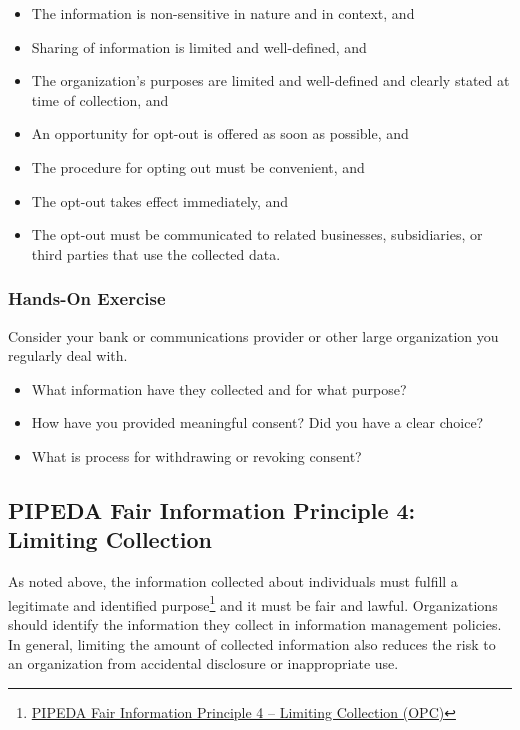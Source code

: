 \begin{itemize}
   \item The information is non-sensitive in nature and in context, and
   \item Sharing of information is limited and well-defined, and
   \item The organization's purposes are limited and well-defined and clearly stated at time of collection, and
   \item An opportunity for opt-out is offered as soon as possible, and
   \item The procedure for opting out must be convenient, and
   \item The opt-out takes effect immediately, and
   \item The opt-out must be communicated to related businesses, subsidiaries, or third parties that use the collected data.
\end{itemize}

\begin{tcolorbox}[colback=code]
\subsubsection*{Hands-On Exercise}
Consider your bank or communications provider or other large organization you regularly deal with. 
\begin{itemize}
  \item What information have they collected and for what purpose?
  \item How have you provided meaningful consent? Did you have a clear choice?
  \item What is process for withdrawing or revoking consent?
\end{itemize}
\end{tcolorbox}

\subsection*{PIPEDA Fair Information Principle 4: Limiting Collection}

As noted above, the information collected about individuals must fulfill a legitimate and identified purpose\footnote{\href{https://www.priv.gc.ca/en/privacy-topics/privacy-laws-in-canada/the-personal-information-protection-and-electronic-documents-act-pipeda/p_principle/principles/p_collection/}{PIPEDA Fair Information Principle 4 -- Limiting Collection (OPC)}} and it must be fair and lawful. Organizations should identify the information they collect in information management policies. In general, limiting the amount of collected information also reduces the risk to an organization from accidental disclosure or inappropriate use. 

